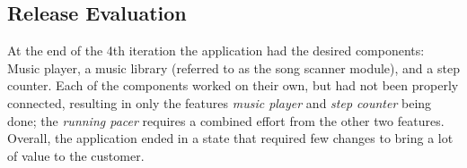 \subsection{Release Evaluation}
At the end of the 4th iteration the application had the desired components: Music player, a music library (referred to as the song scanner module), and a step counter. Each of the components worked on their own, but had not been properly connected, resulting in only the features \textit{music player} and \textit{step counter} being done; the \textit{running pacer} requires a combined effort from the other two features.
Overall, the application ended in a state that required few changes to bring a lot of value to the customer.